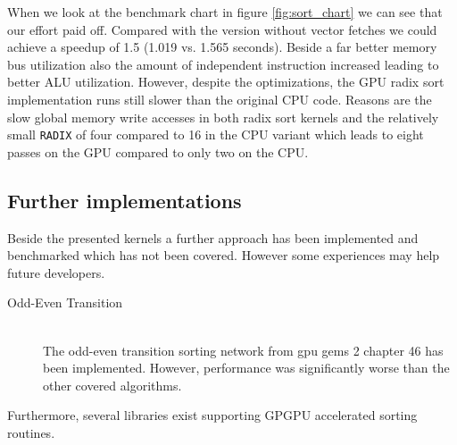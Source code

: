 When we look at the benchmark chart in figure \ref{fig:sort_chart} we can see that our effort paid off. Compared with the version without vector fetches we could achieve a speedup of 1.5 (1.019 vs. 1.565 seconds). Beside a far better memory bus utilization also the amount of independent instruction increased leading to better ALU utilization.
However, despite the optimizations, the GPU radix sort implementation runs still slower than the original CPU code. Reasons are the slow global memory write accesses in both radix sort kernels and the relatively small \lstinline!RADIX! of four compared to 16 in the CPU variant which leads to eight passes on the GPU compared to only two on the CPU.


\subsection{Further implementations}
Beside the presented kernels a further approach has been implemented and benchmarked which has not been covered. However some experiences may help future developers.

\begin{description}
	\item[Odd-Even Transition \cite{gpu_gems_2_chapter_46}] \hfill \\
	The odd-even transition sorting network from gpu gems 2 chapter 46 \cite{gpu_gems_2_chapter_46} has been implemented. However, performance was significantly worse than the other covered algorithms.
\end{description}

Furthermore, several libraries exist supporting GPGPU accelerated sorting routines.

